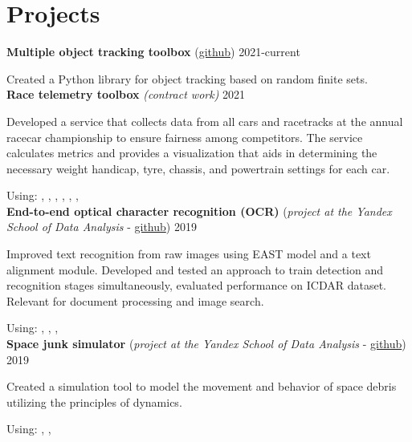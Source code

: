 \section*{\sectionformat Projects}

\textbf{Multiple object tracking toolbox} (\href{https://github.com/neer201/Multi-Object-Tracking-for-Automotive-Systems-in-python}{github}) \hfill 2021-current

Created a Python library for object tracking based on random finite sets.\\
\textbf{Race telemetry toolbox} \textit{(contract work)} \hfill 2021
\par
Developed a service that collects data from all cars and racetracks at the annual racecar championship to ensure fairness among competitors. The service calculates metrics and provides a visualization that aids in determining the necessary weight handicap, tyre, chassis, and powertrain settings for each car.

Using: , , , , , , 
\\
\textbf{End-to-end optical character recognition (OCR)} (\textit{project at the Yandex School of Data Analysis} - \href{https://github.com/neer201/end2end_OCR}{github})  \hfill 2019
\par
Improved text recognition from raw images using EAST model and a text alignment module. Developed and tested an approach to train detection and recognition stages simultaneously, evaluated performance on ICDAR dataset. Relevant for document processing and image search.

Using: , , , 
% 
\\
\textbf{Space junk simulator} (\textit{project at the Yandex School of Data Analysis} - \href{https://github.com/neer201/space_junk_simulator}{github})   \hfill 2019
\par
Created a simulation tool to model the movement and behavior of space debris utilizing the principles of dynamics.

Using: , , 
